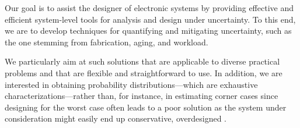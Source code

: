 Our goal is to assist the designer of electronic systems by providing effective
and efficient system-level tools for analysis and design under uncertainty. To
this end, we are to develop techniques for quantifying and mitigating
uncertainty, such as the one stemming from fabrication, aging, and workload.

We particularly aim at such solutions that are applicable to diverse practical
problems and that are flexible and straightforward to use. In addition, we are
interested in obtaining probability distributions---which are exhaustive
characterizations---rather than, for instance, in estimating corner cases since
designing for the worst case often leads to a poor solution as the system under
consideration might easily end up conservative, overdesigned \cite{quinton2012}.
